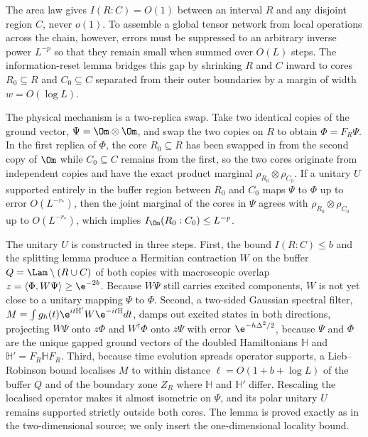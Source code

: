 \begin{inwords}
The area law gives $I(R:C)=O(1)$ between an interval $R$ and any disjoint
region $C$, never $o(1)$. To assemble a global tensor network from local
operations across the chain, however, errors must be suppressed to an
arbitrary inverse power $L^{-p}$ so that they remain small when summed over
$O(L)$ steps. The information-reset lemma bridges this gap by shrinking $R$
and $C$ inward to cores $R_0\subseteq R$ and $C_0\subseteq C$ separated from
their outer boundaries by a margin of width $w=O(\log L)$.

The physical mechanism is a two-replica swap. Take two identical copies of
the ground vector, $\Psi=\Om\otimes\Om$, and swap the two copies on $R$ to
obtain $\Phi=F_R\Psi$. In the first replica of $\Phi$, the core $R_0\subseteq R$
has been swapped in from the second copy of $\Om$ while $C_0\subseteq C$
remains from the first, so the two cores originate from independent copies and
have the exact product marginal $\rho_{R_0}\otimes\rho_{C_0}$. If a unitary $U$
supported entirely in the buffer region between $R_0$ and $C_0$ maps $\Psi$
to $\Phi$ up to error $O(L^{-r_*})$, then the joint marginal of the cores in
$\Psi$ agrees with $\rho_{R_0}\otimes\rho_{C_0}$ up to $O(L^{-r_*})$, which
implies $I_\Om(R_0:C_0)\le L^{-p}$.

The unitary $U$ is constructed in three steps. First, the bound $I(R:C)\le b$
and the splitting lemma produce a Hermitian contraction $W$ on the buffer
$Q=\Lam\setminus(R\cup C)$ of both copies with macroscopic overlap
$z=\langle\Phi,W\Psi\rangle\ge\e^{-2b}$. Because $W\Psi$ still carries excited
components, $W$ is not yet close to a unitary mapping $\Psi$ to $\Phi$.
Second, a two-sided Gaussian spectral filter,
$M=\int g_h(t)\e^{it\mathbb H'}W\e^{-it\mathbb H}dt$, damps out excited states
in both directions, projecting $W\Psi$ onto $z\Phi$ and $W^\dagger\Phi$ onto
$z\Psi$ with error $\e^{-h\Delta^2/2}$, because $\Psi$ and $\Phi$ are the unique
gapped ground vectors of the doubled Hamiltonians $\mathbb H$ and
$\mathbb H'=F_R\mathbb HF_R$. Third, because time evolution spreads operator
supports, a Lieb--Robinson bound localises $M$ to within distance
$\ell=O(1+b+\log L)$ of the buffer $Q$ and of the boundary zone $Z_R$ where
$\mathbb H$ and $\mathbb H'$ differ. Rescaling the localised operator makes it
almost isometric on $\Psi$, and its polar unitary $U$ remains supported strictly
outside both cores. The lemma is proved exactly as in the two-dimensional
source; we only insert the one-dimensional locality bound.
\end{inwords}

